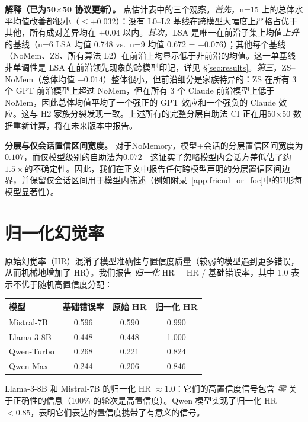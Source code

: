 \documentclass[11pt,a4paper,fontset=fandol]{ctexart}
\begin{document}
\textbf{解释（已为50$\times$50 协议更新）。} 点估计表中的三个观察。\emph{首先}，n=15 上的总体水平均值改善都很小（$\leq +0.032$）：没有 L0--L2 基线在跨模型大幅度上严格占优于其他，所有成对差异均在 $\pm 0.04$ 以内。\emph{其次}，LSA 是唯一在前沿子集上均值\emph{上升}的基线（n=6 LSA 均值 0.748 vs.\ n=9 均值 0.672 = $+0.076$）；其他每个基线（NoMem、ZS、所有算法 L2）在前沿上均显示低于非前沿的均值。这一单基线非单调性是 LSA 在前沿领先现象的跨模型印记，详见 \S\ref{sec:results}。\emph{第三}，ZS--NoMem（总体均值 $+0.014$）整体很小，但前沿细分是家族特异的：ZS 在所有 3 个 GPT 前沿模型上超过 NoMem，但在所有 3 个 Claude 前沿模型上低于 NoMem，因此总体均值平均了一个强正的 GPT 效应和一个强负的 Claude 效应。这与 H2 家族分裂发现一致。上述所有的完整分层自助法 CI 正在用50$\times$50 数据重新计算，将在未来版本中报告。

\textbf{分层与仅会话置信区间宽度。} 对于NoMemory，模型+会话的分层置信区间宽度为$0.107$，而仅模型级别的自助法为$0.072$---这证实了忽略模型内会话方差低估了约$1.5\times$的不确定性。因此，我们在正文中报告任何跨模型声明的分层置信区间边界，并保留仅会话区间用于模型内陈述（例如附录~\ref{app:friend_or_foe}中的U形每模型显著性）。

\section{归一化幻觉率}
\label{app:norm_hr}

原始幻觉率（HR）混淆了模型准确性与置信度质量（较弱的模型遇到更多错误，从而机械地增加了 HR）。我们报告 \emph{归一化} HR = HR / 基础错误率，其中 1.0 表示不优于随机高置信度分配：

\begin{center}
\small
\begin{tabular}{lccc}
\toprule
\textbf{模型} & \textbf{基础错误率} & \textbf{原始 HR} & \textbf{归一化 HR} \\
\midrule
Mistral-7B & 0.596 & 0.590 & 0.990 \\
Llama-3-8B & 0.448 & 0.448 & 1.000 \\
Qwen-Turbo & 0.268 & 0.221 & 0.824 \\
Qwen-Max & 0.244 & 0.206 & 0.846 \\
\bottomrule
\end{tabular}
\end{center}

Llama-3-8B 和 Mistral-7B 的归一化 HR $\approx 1.0$：它们的高置信度信号包含 \emph{零} 关于正确性的信息（100\% 的轮次是高置信度）。Qwen 模型实现了归一化 HR $< 0.85$，表明它们表达的置信度携带了有意义的信号。
\end{document}
